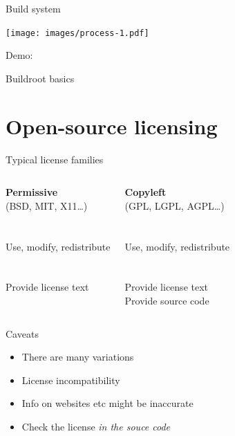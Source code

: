 \documentclass[xetex,table,table]{beamer}
\begin{document}
\begin{frame}{Build system}
  \begin{center}
    \texttt{[image: images/process-1.pdf]}
  \end{center}
\end{frame}

\begin{frame}[standout]
  Demo:

  Buildroot basics
\end{frame}


\section{Open-source licensing}

\begin{frame}{Typical license families}
  \begin{columns}

      \begin{center}
        {\bf Permissive}\\
        (BSD, MIT, X11\dots)\\
      {\ }\\
      \faCheckCircle\\
      Use, modify, redistribute\\
      {\ }\\
      \faExclamationCircle\\
      Provide license text \\
      {\ }
      \end{center}

      \begin{center}
        {\bf Copyleft} \\
        (GPL, LGPL, AGPL\dots)\\
      {\ }\\
      \faCheckCircle\\
      Use, modify, redistribute\\
      {\ }\\
      \faExclamationCircle\\
      Provide license text \\
      Provide source code
      \end{center}

  \end{columns}
\end{frame}

\begin{frame}{Caveats}
  \begin{itemize}
  \item There are many variations
  \item License incompatibility
  \item Info on websites etc might be inaccurate
  \item[\textrightarrow] Check the license {\em in the souce code}
  \end{itemize}
\end{frame}
\end{document}
